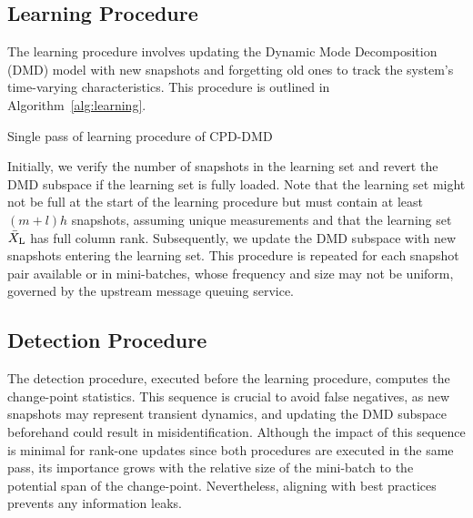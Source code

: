 \subsection{Learning Procedure}\label{learn-cpd}
The learning procedure involves updating the Dynamic Mode Decomposition (DMD) model with new snapshots and forgetting old ones to track the system's time-varying characteristics. This procedure is outlined in Algorithm~\ref{alg:learning}.

\begin{algorithm}
    \caption{Single pass of learning procedure of CPD-DMD}\label{alg:learning}
    \begin{algorithmic}[1]
        \ENDIF{}
    \end{algorithmic}
\end{algorithm}

Initially, we verify the number of snapshots in the learning set and revert the DMD subspace if the learning set is fully loaded. Note that the learning set might not be full at the start of the learning procedure but must contain at least \((m + l) h\) snapshots, assuming unique measurements and that the learning set \(\bar{X} _{\text{L}}\) has full column rank. Subsequently, we update the DMD subspace with new snapshots entering the learning set. This procedure is repeated for each snapshot pair available or in mini-batches, whose frequency and size may not be uniform, governed by the upstream message queuing service.

\subsection{Detection Procedure}\label{detect-cpd}
The detection procedure, executed before the learning procedure, computes the change-point statistics. This sequence is crucial to avoid false negatives, as new snapshots may represent transient dynamics, and updating the DMD subspace beforehand could result in misidentification. Although the impact of this sequence is minimal for rank-one updates since both procedures are executed in the same pass, its importance grows with the relative size of the mini-batch to the potential span of the change-point. Nevertheless, aligning with best practices prevents any information leaks.

